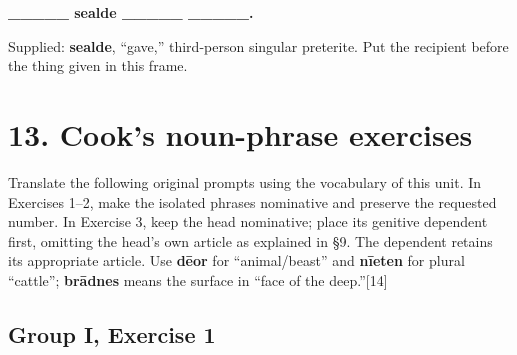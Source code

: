 
\textbf{\_\_\_\_\_ sealde \_\_\_\_\_ \_\_\_\_\_.}\par\nobreak

Supplied: \textbf{sealde}, “gave,” third-person singular preterite. Put the recipient before the thing given in this frame.

\section*{13. Cook's noun-phrase exercises}

Translate the following original prompts using the vocabulary of this unit. In Exercises 1–2, make the isolated phrases nominative and preserve the requested number. In Exercise 3, keep the head nominative; place its genitive dependent first, omitting the head's own article as explained in §9. The dependent retains its appropriate article. Use \textbf{dēor} for “animal/\allowbreak{}beast” and \textbf{nīeten} for plural “cattle”; \textbf{brādnes} means the surface in “face of the deep.”[14]

\subsection*{Group I, Exercise 1}






